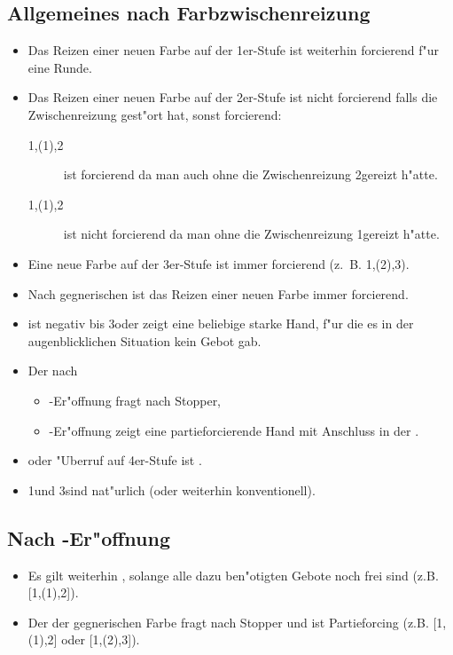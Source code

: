 \subsection{Allgemeines nach Farbzwischenreizung}
\begin{itemize}
\item Das Reizen einer neuen Farbe auf der 1er-Stufe ist weiterhin
forcierend f"ur eine Runde.
%
\item Das Reizen einer neuen Farbe auf der 2er-Stufe ist nicht forcierend
falls die Zwischenreizung gest"ort hat, sonst forcierend:
\begin{description}
\item[1\coe{}\sep(1\pik){}\sep2\kar] ist forcierend da man auch
ohne die Zwischenreizung 2\kar gereizt h"atte.
\item[1\tre{}\sep(1\pik){}\sep2\coe] ist nicht forcierend da man ohne die
  Zwischenreizung 1\coe gereizt h"atte.
\end{description}
%
\item Eine neue Farbe auf der 3er-Stufe ist immer forcierend
  (z.~B. 1\pik{}\sep(2\kar){}\sep3\tre).
\item Nach gegnerischen  ist das Reizen einer neuen Farbe immer
  forcierend.
\item {} ist negativ bis 3\coe oder zeigt eine beliebige
  starke Hand, f"ur die es in der augenblicklichen Situation kein Gebot
  gab.
\item Der  nach
  \begin{itemize}
    \item \ufa-Er"offnung fragt nach Stopper,
    \item \ofa-Er"offnung zeigt eine partieforcierende Hand mit
      Anschluss in der \ofa.
    \end{itemize}
\item {} oder "Uberruf auf 4er-Stufe ist .
\item 1\SA und 3\SA sind nat"urlich (oder weiterhin konventionell).
\end{itemize}

\subsection{Nach \uf-Er"offnung}
\begin{itemize}
\item Es gilt weiterhin , solange alle dazu ben"otigten
	Gebote noch frei sind (z.B. [1\uf{}\sep(1\anybid)\sep2\SA{}]).
\item Der  der gegnerischen Farbe fragt nach Stopper und ist
  Partieforcing (z.B. [1\uf{}\sep(1\anybid){}\sep2\anybid{}] oder
  [1\uf{}\sep(2\anybid)\sep3\anybid{}]).
\end{itemize}

